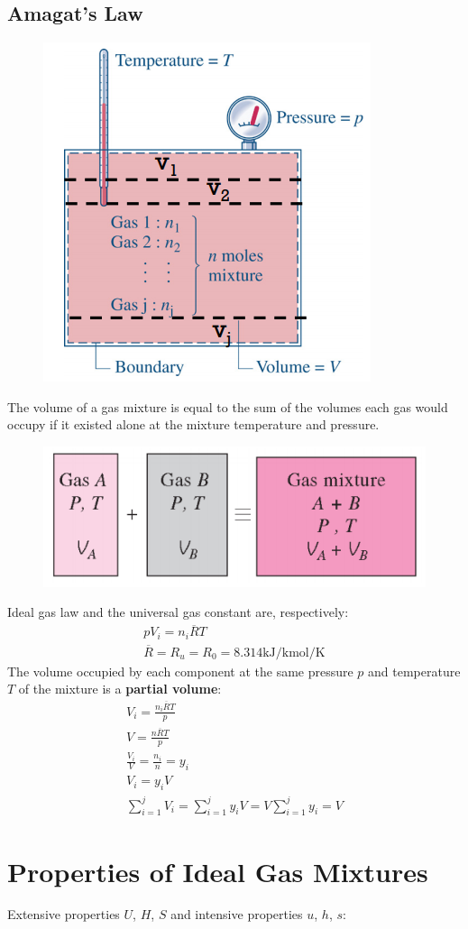 \documentclass[class=report, crop=false, 12pt,a4paper]{standalone}
\begin{document}
\subsection{Amagat’s Law}
\begin{figure}[H]
  \centering
  \includegraphics[width = 0.4 \textwidth]{../img/diagram95.png}
  \caption{}
\end{figure}
The volume of a gas mixture is equal to the sum of the volumes each gas would occupy if it existed alone at the mixture temperature and pressure.
\begin{figure}[H]
  \centering
  \includegraphics[width = 0.65 \textwidth]{../img/diagram96.png}
  \caption{}
\end{figure}
Ideal gas law and the universal gas constant are, respectively:
\begin{gather}
  pV_i = n_i\overline{R}T \\[5pt]
  \overline{R} = R_u = R_0 = 8.314 \si{\kilo\joule\per\kilo\mole\per\kelvin}
\end{gather}
The volume occupied by each component at the same pressure $p$ and temperature $T$ of the mixture is a \textbf{partial volume}: 
\begin{gather}
  V_i = \frac{n_i \overline{R} T}{p} \\[5pt]
  V = \frac{n \overline{R} T}{p} \\[5pt]
  \frac{V_i}{V} = \frac{n_i}{n} = y_i \\[5pt]
  V_i = y_iV \\[5pt]
  \sum_{i=1}^{j}V_i = \sum_{i=1}^{j}y_iV = V\sum_{i=1}^{j}y_i = V
\end{gather}
\section{Properties of Ideal Gas Mixtures}
Extensive properties $U$, $H$, $S$ and intensive properties $u$, $h$, $s$:
\end{document}
